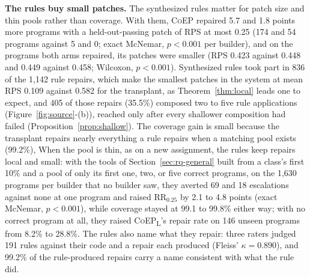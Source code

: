 \documentclass[acmsmall,screen,review,anonymous,nonacm]{acmart}
\newcommand{\tool}{\textsc{CoEP}\xspace}
\newcommand{\coepL}{\textsc{CoEP}\textsubscript{L}\xspace}
\begin{document}
\textbf{The rules buy small patches.} The synthesized rules matter for patch size and thin pools rather than coverage. With them, \tool repaired 5.7 and 1.8 points more programs with a held-out-passing patch of RPS at most 0.25 (174 and 54 programs against 5 and 0; exact McNemar, $p < 0.001$ per builder), and on the programs both arms repaired, its patches were smaller (RPS 0.423 against 0.448 and 0.449 against 0.458; Wilcoxon, $p < 0.001$). Synthesized rules took part in 836 of the 1{,}142 rule repairs, which make the smallest patches in the system at mean RPS 0.109 against 0.582 for the transplant, as Theorem~\ref{thm:local} leads one to expect, and 405 of those repairs (35.5\%) composed two to five rule applications (Figure~\ref{fig:source}-(b)), reached only after every shallower composition had failed (Proposition~\ref{prop:shallow}). The coverage gain is small because the transplant repairs nearly everything a rule repairs when a matching pool exists (99.2\%), When the pool is thin, as on a new assignment, the rules keep repairs local and small: with the tools of Section~\ref{sec:rq-general} built from a class's first 10\% and a pool of only its first one, two, or five correct programs, on the 1{,}630 programs per builder that no builder saw, they averted 69 and 18 escalations against none at one program and raised $\mathrm{RR}_{0.25}$ by 2.1 to 4.8 points (exact McNemar, $p < 0.001$), while coverage stayed at 99.1 to 99.8\% either way; with no correct program at all, they raised \coepL's repair rate on 146 unseen programs from 8.2\% to 28.8\%. The rules also name what they repair: three raters judged 191 rules against their code and a repair each produced (Fleiss' $\kappa = 0.890$), and 99.2\% of the rule-produced repairs carry a name consistent with what the rule did.
\end{document}
